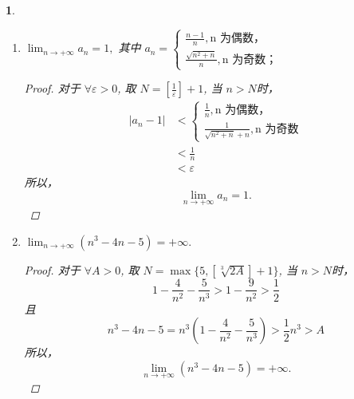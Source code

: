 \documentclass[utf8]{book}
\newtheorem{example}{}[section]             %
\begin{document}
\begin{example}
\begin{enumerate}
        \item $\displaystyle \lim_{n\to +\infty}a_n = 1,$ 其中 
        $a_n = 
         \begin{cases}
         \displaystyle\frac{n-1}{n}, \text{n 为偶数，}\\
         \displaystyle\frac{\sqrt{n^2+ n}}{n}, \text{n 为奇数；}
		\end{cases}$      
		
		\begin{proof}
         对于 $\forall \varepsilon > 0$, 取 $N = \left [ \frac{1}{\varepsilon}\right ] + 1$, 当 $n > N$时，
         \begin{equation*}
         \begin{aligned}
         \left | a_n - 1\right | &<
         \begin{cases}
         \displaystyle\frac{1}{n}, \text{n 为偶数，}\\
         \displaystyle\frac{1}{\sqrt{n^2 + n} + n} , \text{n 为奇数}
		\end{cases}\\
		&< \frac{1}{n} \\
		&< \varepsilon
		\end{aligned}
		\end{equation*}
        所以， $$\lim_{n\to +\infty}a_n = 1.$$  
        \end{proof} 
        
        \item $\displaystyle \lim_{n\to +\infty}(n^3 - 4n - 5) = +\infty.$		
		\begin{proof}
         对于 $\forall A > 0$, 取 $N = \max\{5, \left [ \sqrt[3]{2A}\right ] + 1\}$, 当 $n > N$时，
         $$1 - \frac{4}{n^2} - \frac{5}{n^3} > 1 - \frac{9}{n^2} > \frac{1}{2}$$且
         $$n^3 - 4n - 5 = n^3(1 - \frac{4}{n^2} - \frac{5}{n^3}) > \frac{1}{2}n^3 > A$$
        所以， $$\lim_{n\to +\infty}(n^3 - 4n - 5) = +\infty.$$  
        \end{proof}  
\end{enumerate}
\endgroup
\end{example}
\end{document}
